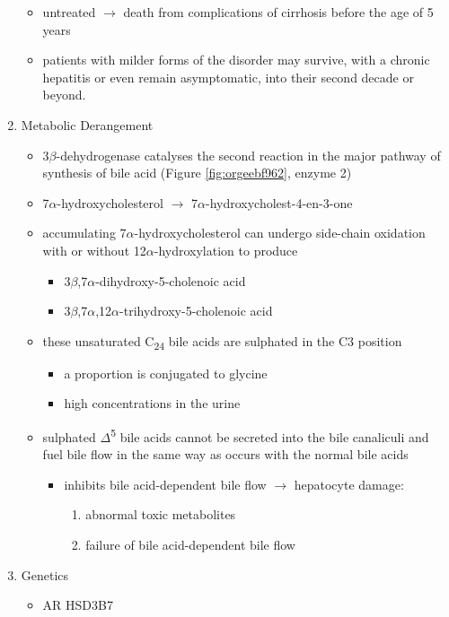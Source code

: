 \documentclass{scrartcl}
\begin{document}
\begin{enumerate}
\begin{itemize}
\item untreated \(\to\) death from complications of cirrhosis before the age
of 5 years
\item patients with milder forms of the disorder may survive, with a
chronic hepatitis or even remain asymptomatic, into their second
decade or beyond.
\end{itemize}
\item Metabolic Derangement
\label{sec:org1f8def8}
\begin{itemize}
\item 3\(\beta\)-dehydrogenase catalyses the second reaction in the major
pathway of synthesis of bile acid (Figure \ref{fig:orgeebf962}, enzyme 2)
\item 7\(\alpha\)-hydroxycholesterol \(\to\) 7\(\alpha\)-hydroxycholest-4-en-3-one
\item accumulating 7\(\alpha\)-hydroxycholesterol can undergo side-chain
oxidation with or without 12\(\alpha\)-hydroxylation to produce
\begin{itemize}
\item 3\(\beta\),7\(\alpha\)-dihydroxy-5-cholenoic acid
\item 3\(\beta\),7\(\alpha\),12\(\alpha\)-trihydroxy-5-cholenoic acid
\end{itemize}
\item these unsaturated C\textsubscript{24} bile acids are sulphated in the C3 position
\begin{itemize}
\item a proportion is conjugated to glycine
\item high concentrations in the urine
\end{itemize}
\item sulphated \(\Delta\)\textsuperscript{5} bile acids cannot be secreted into the bile
canaliculi and fuel bile flow in the same way as occurs with the
normal bile acids
\begin{itemize}
\item inhibits bile acid-dependent bile flow \(\to\) hepatocyte damage:
\begin{enumerate}
\item abnormal toxic metabolites
\item failure of bile acid-dependent bile flow
\end{enumerate}
\end{itemize}
\end{itemize}

\item Genetics
\label{sec:org7faa6cf}
\begin{itemize}
\item AR HSD3B7
\end{itemize}


\end{enumerate}
\end{document}
